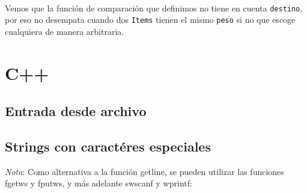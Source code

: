 \documentclass[10pt,letterpaper]{article}
\begin{document}
\ttfamily 
{}
\\ \normalfont\normalsize
\medskip
Vemos que la función de comparación que definimos no tiene en cuenta \texttt{destino},
por eso no desempata cuando dos \texttt{Items} tienen el mismo \texttt{peso} si no que escoge
cualquiera de manera arbitraria.

\section{C++}
\subsection{Entrada desde archivo}

\subsection{Strings con caractéres especiales}

\emph{Nota}: Como alternativa a la función getline, se pueden utilizar las funciones fgetws y fputws, y más adelante swscanf y wprintf:
\end{document}
